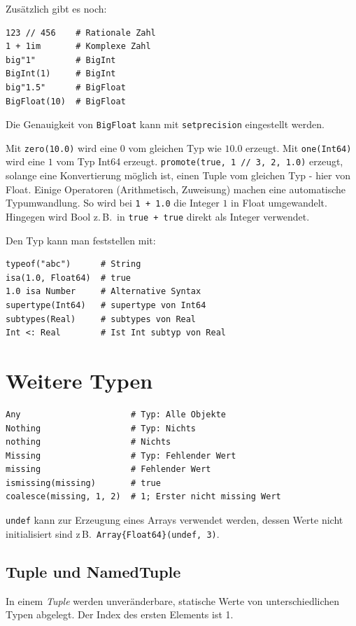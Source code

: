 \documentclass[10pt,twocolumn]{scrartcl}
\begin{document}
Zusätzlich gibt es noch:
\begin{lstlisting}
123 // 456    # Rationale Zahl
1 + 1im       # Komplexe Zahl
big"1"        # BigInt
BigInt(1)     # BigInt
big"1.5"      # BigFloat
BigFloat(10)  # BigFloat
\end{lstlisting}

Die Genauigkeit von \lstinline|BigFloat| kann mit \lstinline|setprecision| eingestellt werden.

Mit \lstinline|zero(10.0)| wird eine $0$ vom gleichen Typ wie $10.0$ erzeugt.
Mit \lstinline|one(Int64)| wird eine $1$ vom Typ Int64 erzeugt.
\lstinline|promote(true, 1 // 3, 2, 1.0)| erzeugt, solange eine Konvertierung
möglich ist, einen Tuple vom gleichen Typ - hier von Float. Einige Operatoren
(Arithmetisch, Zuweisung) machen eine automatische Typumwandlung. So wird bei
\lstinline|1 + 1.0| die Integer $1$ in Float umgewandelt. Hingegen wird Bool z.\,B.\ in \lstinline|true + true| direkt als Integer verwendet. 

Den Typ kann man feststellen mit:
\begin{lstlisting}
typeof("abc")      # String
isa(1.0, Float64)  # true
1.0 isa Number     # Alternative Syntax
supertype(Int64)   # supertype von Int64
subtypes(Real)     # subtypes von Real
Int <: Real        # Ist Int subtyp von Real
\end{lstlisting}

\section{Weitere Typen}
\label{sec:weitereTypen}

\begin{lstlisting}
Any                      # Typ: Alle Objekte
Nothing                  # Typ: Nichts
nothing                  # Nichts
Missing                  # Typ: Fehlender Wert
missing                  # Fehlender Wert
ismissing(missing)       # true
coalesce(missing, 1, 2)  # 1; Erster nicht missing Wert
\end{lstlisting}

\lstinline|undef| kann zur Erzeugung eines Arrays verwendet werden, dessen Werte
nicht initialisiert sind z\,B.\ \lstinline|Array{Float64}(undef, 3)|.

\subsection{Tuple und NamedTuple}
\label{ssec:tuple}

In einem \emph{Tuple} werden unveränderbare, statische Werte von unterschiedlichen Typen abgelegt. Der Index des ersten Elements ist 1.
\end{document}
